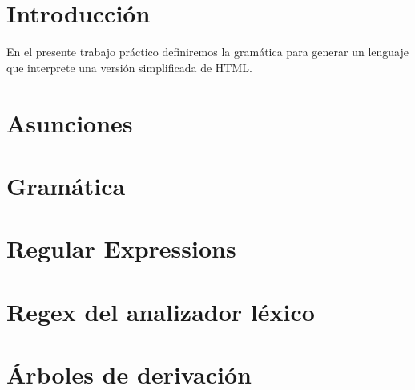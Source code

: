 \documentclass[11pt, a4paper, spanish]{article}
\newenvironment{borde}[1]
{\begin{lrbox}{\fmbox}\begin{minipage}{#1}}
{\end{minipage}\end{lrbox}\fbox{\usebox{\fmbox}}\\[10pt]}
\begin{document}
	


\section{Introducci\'on}

 En el presente trabajo pr\'actico definiremos la gram\'atica para generar un lenguaje que interprete una versi\'on simplificada de HTML.

\section{Asunciones}

\section{Gram\'atica}
	
\section{Regular Expressions}

\section{Regex del analizador l\'exico}

\section{\'Arboles de derivaci\'on}
\end{document}
